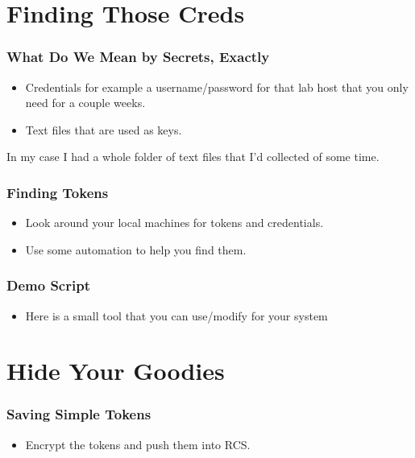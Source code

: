 \documentclass[aspectratio=169]{beamer}
\makeatletter
\def\sectionsubtitle#1{\gdef\@sectionsubtitle{#1}}
\gdef\@sectionsubtitle{}
\makeatother
\begin{document}
\sectionsubtitle{What is it you want to protect?}
\section{Finding Those Creds}

\begin{frame}
	\frametitle{What Do We Mean by Secrets, Exactly}
	\begin{itemize}
		\item Credentials for example a username/password for that lab host that you only need for a couple weeks.
		\item Text files that are used as keys.
	\end{itemize}

    \note[item]In my case I had a whole folder of text files that I'd collected of some time.
\end{frame}

\begin{frame}
	\frametitle{Finding Tokens}
	\begin{itemize}
		\item Look around your local machines for tokens and credentials.
		\item Use some automation to help you find them.
	\end{itemize}
\end{frame}

\begin{frame}
	\frametitle{Demo Script}
	\begin{itemize}
		\item Here is a small tool that you can use/modify for your system
	\end{itemize}
\end{frame}

\sectionsubtitle{We found the secrets, now what?}
\section{Hide Your Goodies}

\begin{frame}
	\frametitle{Saving Simple Tokens}
	\begin{itemize}
		\item Encrypt the tokens and push them into RCS.
	\end{itemize}
\end{frame}
\end{document}
